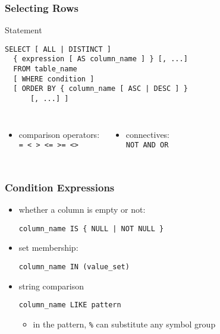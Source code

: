 \documentclass[dvipsnames]{beamer}
\theoremstyle{plain}
\begin{document}
\begin{frame}[fragile]
  \frametitle{Selecting Rows}

  \begin{block}{Statement}
    \begin{lstlisting}
SELECT [ ALL | DISTINCT ]
  { expression [ AS column_name ] } [, ...]
  FROM table_name
  [ WHERE condition ]
  [ ORDER BY { column_name [ ASC | DESC ] }
      [, ...] ]
    \end{lstlisting}
  \end{block}

  \pause
  \begin{columns}
    \begin{itemize}
      \item comparison operators:\\
        \lstinline!= < > <= >= <>!
    \end{itemize}

    \begin{itemize}
      \item connectives:\\
        \lstinline!NOT AND OR!
    \end{itemize}
  \end{columns}
\end{frame}

\begin{frame}[fragile]
  \frametitle{Condition Expressions}

  \begin{itemize}
    \item whether a column is empty or not:\\
    \begin{lstlisting}
column_name IS { NULL | NOT NULL }
    \end{lstlisting}

    \pause
    \item set membership:\\
    \begin{lstlisting}
column_name IN (value_set)
    \end{lstlisting}

    \pause
    \item string comparison
    \begin{lstlisting}
column_name LIKE pattern
    \end{lstlisting}
    \begin{itemize}
      \item in the pattern, \lstinline!%! can substitute any symbol group
    \end{itemize}
  \end{itemize}
\end{frame}
\end{document}
